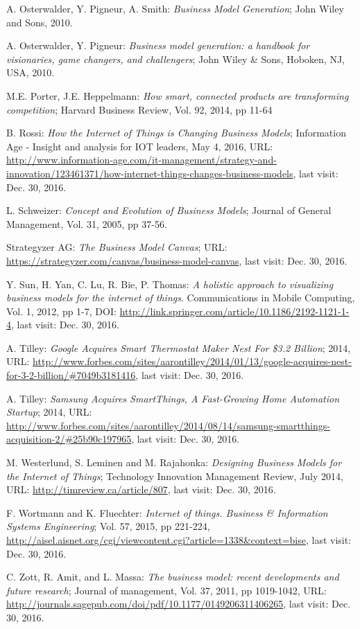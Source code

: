\begin{thebibliography}{99}
	 A. Osterwalder, Y. Pigneur, A. Smith: \emph{Business Model Generation}; John Wiley and Sons, 2010.

	 A. Osterwalder, Y. Pigneur:  \emph{Business model generation: a handbook for visionaries, game changers, and challengers};  John Wiley \& Sons, Hoboken, NJ, USA, 2010.

 	 M.E. Porter, J.E. Heppelmann: \emph{How smart, connected products are transforming competition}; Harvard Business Review, Vol. 92, 2014, pp 11-64
	
	 B. Rossi: \emph{How the Internet of Things is Changing Business Models}; Information Age - Insight and analysis for IOT leaders, May 4, 2016, URL: \url{http://www.information-age.com/it-management/strategy-and-innovation/123461371/how-internet-things-changes-business-models}, last visit: Dec. 30, 2016.

	 L. Schweizer: \emph{Concept and Evolution of Business Models}; Journal of General Management, Vol. 31, 2005, pp 37-56.

	 Strategyzer AG: \emph{The Business Model Canvas}; URL: \url{https://strategyzer.com/canvas/business-model-canvas}, last visit: Dec. 30, 2016.

	 Y. Sun, H. Yan, C. Lu, R. Bie, P. Thomas: \emph{A holistic  approach to visualizing business models for the internet of things}. Communications in Mobile Computing, Vol. 1, 2012, pp 1-7, DOI: \url{http://link.springer.com/article/10.1186/2192-1121-1-4}, last visit: Dec. 30, 2016.
	
 	 A. Tilley: \emph{Google Acquires Smart Thermostat Maker Nest For \$3.2 Billion}; 2014, URL: \url{http://www.forbes.com/sites/aarontilley/2014/01/13/google-acquires-nest-for-3-2-billion/#7049b3181416}, last visit: Dec. 30, 2016.
	
 	  A. Tilley: \emph{Samsung Acquires SmartThings, A Fast-Growing Home Automation Startup}; 2014, URL: \url{http://www.forbes.com/sites/aarontilley/2014/08/14/samsung-smartthings-acquisition-2/#25b90c197965}, last visit: Dec. 30, 2016.

	 M. Westerlund, S. Leminen and M. Rajahonka: \emph{Designing Business Models for the Internet of Things}; Technology Innovation Management Review, July 2014, URL: \url{http://timreview.ca/article/807}, last visit: Dec. 30, 2016.

	 F. Wortmann and K. Fluechter: \emph{Internet of things. Business \& Information Systems Engineering}; Vol. 57, 2015, pp 221-224, \url{http://aisel.aisnet.org/cgi/viewcontent.cgi?article=1338&context=bise}, last visit: Dec. 30, 2016.

	 C. Zott, R. Amit, and L. Massa: \emph{The business model: recent developments and future research}; Journal of management, Vol. 37, 2011, pp 1019-1042, URL: \url{http://journals.sagepub.com/doi/pdf/10.1177/0149206311406265}, last visit: Dec. 30, 2016.
 \end{thebibliography}



